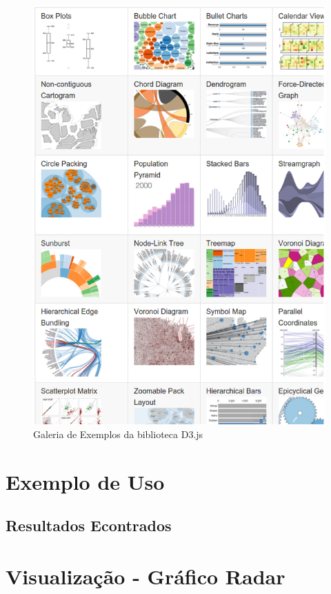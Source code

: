 \begin{figure}[!htb]
	\centering
    \includegraphics[keepaspectratio=true,scale=0.5]
    {figuras/d3_gallery.eps}
  \caption{Galeria de Exemplos da biblioteca D3.js}
  \label{fig:d3_gallery}
\end{figure}

\section{Exemplo de Uso}


\subsection{Resultados Econtrados}

\section{Visualização - Gráfico Radar}
